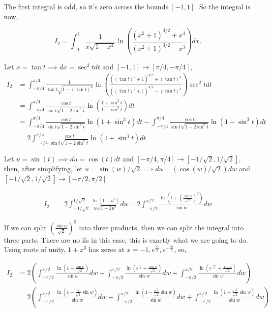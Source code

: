 \documentclass{article}
\begin{document}
The first integral is odd, so it's zero across the bounds $[-1, 1]$. So the integral is now,

$$I_{2} = \int_{-1}^{1}{\frac{1}{x\sqrt{1-x^4}} \ln\left( \frac{(x^2 + 1)^{3/2} + x^3}{(x^2 + 1)^{3/2} - x^3} \right)dx}.$$

Let $x = \tan{t} \implies dx = \sec^2{t}dt$ and $[-1, 1] \to [\pi/4, -\pi/4]$,
\begin{align*}
    I_{2} &= \int_{-\pi/4}^{\pi/4}{\frac{1}{\tan{t}\sqrt{1-(\tan{t})^4}} \ln\left( \frac{((\tan{t})^2 + 1)^{3/2} + (\tan{t})^3}{((\tan{t})^2 + 1)^{3/2} - (\tan{t})^3} \right)\sec^2{t}dt} \\
    &= \int_{-\pi/4}^{\pi/4}{\frac{\cos{t}}{\sin{t}\sqrt{1 - 2\sin^2{t}}} \ln\left( \frac{1 + \sin^3 t}{1 - \sin^3 t} \right) dt} \\
    &= \int_{-\pi/4}^{\pi/4}{\frac{\cos{t}}{\sin{t}\sqrt{1 - 2\sin^2{t}}} \ln\left( 1 + \sin^3 t \right) dt} - \int_{-\pi/4}^{\pi/4}{\frac{\cos{t}}{\sin{t}\sqrt{1 - 2\sin^2{t}}} \ln\left( 1 - \sin^3 t \right) dt}\\
    &= 2\int_{-\pi/4}^{\pi/4}{\frac{\cos{t}}{\sin{t}\sqrt{1 - 2\sin^2{t}}} \ln\left( 1 + \sin^3 t \right) dt}
\end{align*}

Let $u = \sin(t) \implies du = \cos(t)dt$ and $[-\pi/4, \pi/4] \to [-1/\sqrt{2}, 1/\sqrt{2}]$, then, after simplifying, let $u = \sin(w)/\sqrt{2} \implies du = (\cos(w)/\sqrt{2}) dw$ and $[-1/\sqrt{2}, 1/\sqrt{2}] \to [-\pi/2, \pi/2]$

\begin{align*}
    I_{2} &= 2\int_{-1/\sqrt{2}}^{1/\sqrt{2}}{\frac{\ln\left( 1 + u^3 \right)}{u\sqrt{1 - 2u^2}}du} = 2\int_{-\pi/2}^{\pi/2}{\frac{\ln\left( 1 + \left(\frac{\sin w}{\sqrt{2}}\right)^3 \right)}{\sin{w}}dw}
\end{align*}

If we can split $\left(\frac{\sin w}{\sqrt{2}}\right)^3$ into three products, then we can split the integral into three parts. There are no ifs in this case, this is exactly what we are going to do. Using roots of unity, $1 + x^3$ has zeros at $x = -1, e^{\frac{\pi i}{3}}, e^{-\frac{\pi i}{3}}$, so,

\begin{align*}
    I_{2} &= 2\left( \int_{-\pi/2}^{\pi/2}{\frac{\ln\left( 1 + \frac{\sin{w}}{\sqrt{2}} \right)}{\sin{w}}dw} + \int_{-\pi/2}^{\pi/2}{\frac{\ln\left( e^{\frac{\pi i}{3}} + \frac{\sin{w}}{\sqrt{2}} \right)}{\sin{w}}dw} + \int_{-\pi/2}^{\pi/2}{\frac{\ln\left( e^{\frac{-\pi i}{3}} + \frac{\sin{w}}{\sqrt{2}} \right)}{\sin{w}}dw} \right) \\
    &= 2\left( \int_{-\pi/2}^{\pi/2}{\frac{\ln\left( 1 + \frac{1}{\sqrt{2}}\sin{w} \right)}{\sin{w}}dw} + \int_{-\pi/2}^{\pi/2}{\frac{\ln\left( 1 - \frac{e^{\frac{\pi i}{3}}}{\sqrt{2}}\sin{w} \right)}{\sin{w}}dw} + \int_{-\pi/2}^{\pi/2}{\frac{\ln\left( 1 - \frac{e^{\frac{-\pi i}{3}}}{\sqrt{2}}\sin{w} \right)}{\sin{w}}dw} \right) \\
\end{align*}
\end{document}
